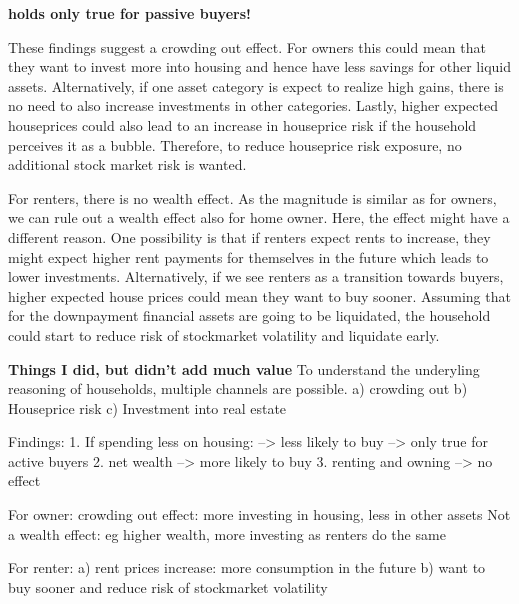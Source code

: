 \documentclass[ProjectABM]{subfiles}
\begin{document}





\textbf{holds only true for passive buyers!}

These findings suggest a crowding out effect. For owners this could mean that they want to invest more into housing and hence have less savings for other liquid assets. Alternatively, if one asset category is expect to realize high gains, there is no need to also increase investments in other categories. Lastly, higher expected houseprices could also lead to an increase in houseprice risk if the household perceives it as a bubble. Therefore, to reduce houseprice risk exposure, no additional stock market risk is wanted.

For renters, there is no wealth effect. As the magnitude is similar as for owners, we can rule out a wealth effect also for home owner. Here, the effect might have a different reason. One possibility is that if renters expect rents to increase, they might expect higher rent payments for themselves in the future which leads to lower investments. Alternatively, if we see renters as a transition towards buyers, higher expected house prices could mean they want to buy sooner. Assuming that for the downpayment financial assets are going to be liquidated, the household could start to reduce risk of stockmarket volatility and liquidate early.

\textbf{Things I did, but didn't add much value}
To understand the underyling reasoning of households, multiple channels are possible.
a) crowding out
b) Houseprice risk
c) Investment into real estate

Findings:
1. If spending less on housing:  --> less likely to buy --> only true for active buyers
2. net wealth --> more likely to buy
3. renting and owning --> no effect

For owner: crowding out effect: more investing in housing, less in other assets
Not a wealth effect: eg higher wealth, more investing as renters do the same

For renter: 
a) rent prices increase: more consumption in the future
b) want to buy sooner and reduce risk of stockmarket volatility
\end{document}
